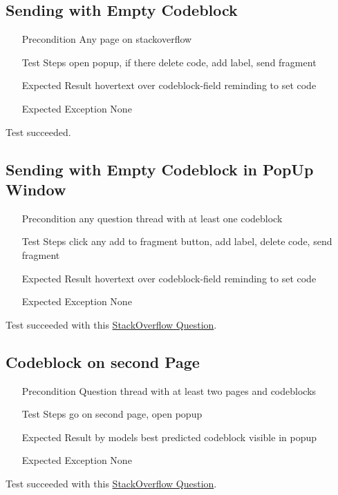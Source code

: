\documentclass{report}
\begin{document}
\subsection*{Sending with Empty Codeblock}
\begin{itemize}
	\item[Precondition] Any page on stackoverflow
	\item[Test Steps] open popup, if there delete code, add label, send fragment
	\item[Expected Result] hovertext over codeblock-field reminding to set code
	\item[Expected Exception] None
\end{itemize}
Test succeeded.

\subsection*{Sending with Empty Codeblock in PopUp Window}
\begin{itemize}
	\item[Precondition] any question thread with at least one codeblock
	\item[Test Steps] click any add to fragment button, add label, delete code, send fragment
	\item[Expected Result] hovertext over codeblock-field reminding to set code
	\item[Expected Exception] None
\end{itemize}
Test succeeded with this \href{https://stackoverflow.com/questions/442404/retrieve-the-position-x-y-of-an-html-element}{StackOverflow Question}.

\subsection*{Codeblock on second Page}
\begin{itemize}
	\item[Precondition] Question thread with at least two pages and codeblocks
	\item[Test Steps] go on second page, open popup
	\item[Expected Result] by models best predicted codeblock visible in popup
	\item[Expected Exception] None
\end{itemize}
Test succeeded with this \href{https://stackoverflow.com/questions/221294/how-do-you-get-a-timestamp-in-javascript?page=2}{StackOverflow Question}.
\end{document}
